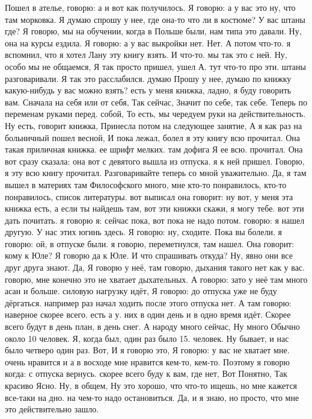 Пошел в ателье, говорю: а и вот как получилось.
Я говорю: а у вас это ну, что там морковка.
Я думаю спрошу у нее, где она-то что ли в костюме?
У вас штаны где?
Я говорю, мы на обучении, когда в Польше были, нам типа это давали.
Ну, она на курсы ездила.
Я говорю: а у вас выкройки нет.
Нет.
А потом что-то. я вспомнил, что я хотел Лану эту книгу взять.
И что-то.
мы так это с ней.
Ну, особо мы не общаемся, Я так просто пришел, ушел А.
тут что-то про эти.
штаны разговаривали. Я так это расслабился. думаю Прошу у нее, думаю по книжку какую-нибудь у вас можно взять?
есть у меня книжка, ладно, я буду говорить вам.
Сначала на себя или от себя, Так сейчас, Значит по себе, так себе.
Теперь по переменам руками перед.
собой, То есть, мы чередуем руки на действительность. Ну есть, говорит книжка, Принесла потом на следующее занятие, А я как раз на больничный пошел весной, И пока лежал, болел я эту
книгу всю прочитал. Она такая приличная книжка.
ее шрифт мелких.
там дофига Я ее всю.
прочитал.
Она вот сразу сказала: она вот с девятого вышла из отпуска. я к ней пришел.
Говорю, я эту всю книгу прочитал.
Разговаривайте теперь со мной уважительно.
Да, я там вышел в материях там Философского много, мне кто-то понравилось, кто-то понравилось, список литературы. вот выписал она говорит: ну вот, у меня эта книжка есть, а если ты найдешь там, вот эти книжки скажи, я могу тебе.
вот эти дать почитать. я говорю я:
сейчас пока, вот пока не надо потом.
говорю: я нашел другую.
У нас этих югинь здесь.
Я говорю: ну, сходите.
Пока вы болели. я говорю: ой, в отпуске были. я говорю, переметнулся, там нашел.
Она говорит: кому к Юле?
Я говорю да к Юле.
И что спрашивать откуда?
Ну, явно они все друг друга знают.
Да, Я говорю у неё, там говорю, дыхания такого нет как у вас. говорю, мне конечно это не хватает дыхательных.
А говорю: зато у неё там много асан и больше.
силовую нагрузку идёт, Я говорю: до отпуска уже не буду дёргаться.
например раз начал ходить после этого отпуска нет. А там говорю: наверное скорее всего.
есть а у.
них в один день и в одно время идёт.
Скорее всего будут в день план, в день снег. А народу много сейчас, Ну много Обычно около 10 человек.
Я, когда был, один раз было 15.
человек. Ну бывает, и нас было четверо один раз. Вот, И я говорю это, Я говорю: у вас не хватает мне.
очень нравится и
а в восходе мне нравится кем-то, кем-то. Поэтому я говорю когда:
с отпуска вернусь.
скорее всего буду к вам, где нет, Вот Понятно, Так красиво Ясно. Ну, в общем,
Ну это хорошо, что что-то ищешь, но мне кажется все-таки на дно. на чем-то надо остановиться.
Да, и я знаю, но просто, что мне это действительно зашло.

